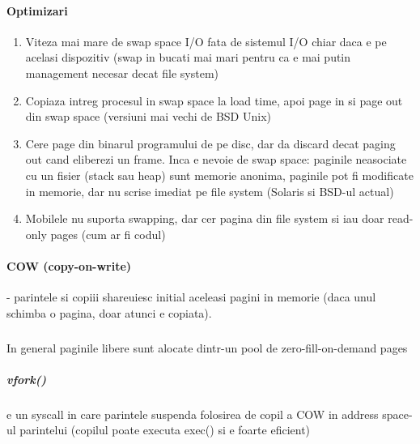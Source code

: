 \documentclass{article}
\begin{document}
\paragraph*{Optimizari}
\begin{enumerate}
    \item Viteza mai mare de swap space I/O fata de sistemul I/O chiar daca e pe acelasi dispozitiv (swap in bucati mai mari pentru ca e mai putin management necesar decat file system)
    \item Copiaza intreg procesul in swap space la load time, apoi page in si page out din swap space (versiuni mai vechi de BSD Unix)
    \item Cere page din binarul programului de pe disc, dar da discard decat paging out cand eliberezi un frame. Inca e nevoie de swap space: paginile neasociate cu un fisier (stack sau heap) sunt memorie anonima, paginile pot fi modificate in memorie, dar nu scrise imediat pe file system (Solaris si BSD-ul actual)
    \item Mobilele nu suporta swapping, dar cer pagina din file system si iau doar read-only pages (cum ar fi codul)
\end{enumerate}

\paragraph*{COW (copy-on-write)} - parintele si copiii shareuiesc initial aceleasi pagini in memorie (daca unul schimba o pagina, doar atunci e copiata). 
\subparagraph*{}In general paginile libere sunt alocate dintr-un pool de zero-fill-on-demand pages
\subparagraph*{vfork()} e un syscall in care parintele suspenda folosirea de copil a COW in address space-ul parintelui (copilul poate executa exec() si e foarte eficient)
\end{document}
